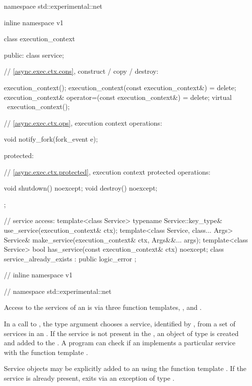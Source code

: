 \begin{codeblock}
namespace std::experimental::net {
inline namespace v1 {

  class execution_context
  {
  public:
    class service;

    // \ref{async.exec.ctx.cons}, construct / copy / destroy:

    execution_context();
    execution_context(const execution_context&) = delete;
    execution_context& operator=(const execution_context&) = delete;
    virtual ~execution_context();

    // \ref{async.exec.ctx.ops}, execution context operations:

    void notify_fork(fork_event e);

  protected:

    // \ref{async.exec.ctx.protected}, execution context protected operations:

    void shutdown() noexcept;
    void destroy() noexcept;
  };

  // service access:
  template<class Service> typename Service::key_type&
    use_service(execution_context& ctx);
  template<class Service, class... Args> Service&
    make_service(execution_context& ctx, Args&&... args);
  template<class Service> bool has_service(const execution_context& ctx) noexcept;
  class service_already_exists : public logic_error { };

} // inline namespace v1
} // namespace std::experimental::net
\end{codeblock}

\pnum
Access to the services of an  is via three function templates, ,  and .

\pnum
In a call to , the type argument chooses a service, identified by , from a set of services in an . If the service is not present in the , an object of type  is created and added to the . A program can check if an  implements a particular service with the function template .

\pnum
Service objects may be explicitly added to an  using the function template . If the service is already present,  exits via an exception of type .

